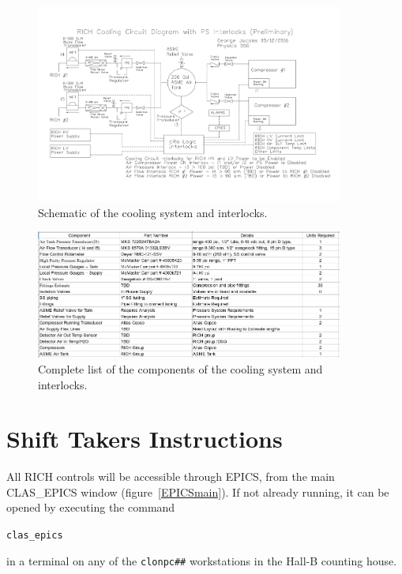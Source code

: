 \documentclass[12pt]{article}
\begin{document}
\begin{figure}[h!]
\center
\includegraphics[width=0.9\textwidth]{Cooling_interlocks.jpg}
\caption{ \label{fig:Cooling_interlocks} Schematic of the cooling system and interlocks.}
\end{figure}

\begin{figure}[h!]
\center
\includegraphics[width=0.9\textwidth]{Cooling_components.jpg}
\caption{ \label{fig:Cooling_components} Complete list of the components of the cooling system and interlocks.}
\end{figure}



{\color{blue}
 \twocolumn
\part{Shift Takers Instructions}
}
All RICH controls will be  accessible through EPICS, from the main CLAS\_EPICS window (figure~\ref{EPICSmain}).  If not already running, it can be opened by executing
the command 
\begin{center}
\texttt{clas\_epics}
\end{center}
 in a terminal on any of the \texttt{clonpc\#\#} workstations in the Hall-B counting house.
\end{document}
